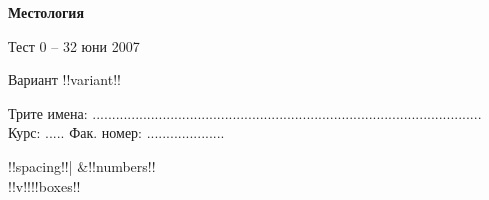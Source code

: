 \documentclass[a4paper,10pt]{report}
\begin{document}
\begin{center}
{\Large\textbf{Местология}} %

Тест 0 – 32 юни 2007 %

Вариант !!variant!! %
\end{center} 
Трите имена: ....................................................................................................   Курс: ..... Фак. номер: ....................
\newcommand{\columnFormat}{|@{}c@{}}

\begin{tabular}{!!spacing!!|}
\hline
&!!numbers!!\\
\hline
 \tableExtra
\hline
!!v!!!!boxes!!\\
\hline
\end{tabular} 


\setlength{\parindent}{0mm}
\setlength{\parskip}{0cm} 
\setlength{\baselineskip}{0cm} 
\setlength{\itemsep}{-1cm} 
\end{document}
